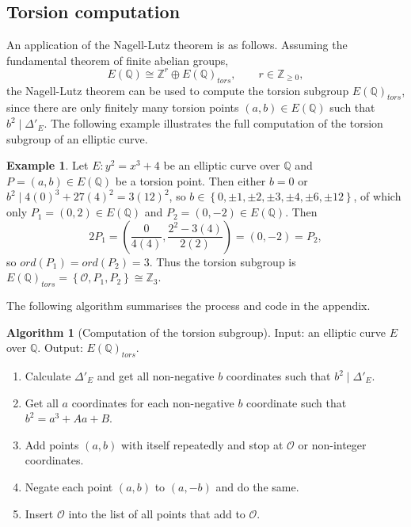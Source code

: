 \documentclass{article}
\newcommand{\Z}{\mathbb{Z}}
\newcommand{\Q}{\mathbb{Q}}
\newcommand{\rb}[1]{\left( #1 \right)}
\newcommand{\cb}[1]{\left\{ #1 \right\}}
\theoremstyle{definition}\newtheorem*{definition}{Definition}
\theoremstyle{definition}\newtheorem*{example}{Example}
\theoremstyle{definition}\newtheorem*{remark}{Remark}
\newtheorem{algorithm}[proposition]{Algorithm}
\begin{document}
\subsection{Torsion computation}

An application of the Nagell-Lutz theorem is as follows. Assuming the fundamental theorem of finite abelian groups,
$$ E\rb{\Q} \cong \Z^r \oplus E\rb{\Q}_{tors}, \qquad r \in \Z_{\ge 0}, $$
the Nagell-Lutz theorem can be used to compute the torsion subgroup $ E\rb{\Q}_{tors} $, since there are only finitely many torsion points $ \rb{a, b} \in E\rb{\Q} $ such that $ b^2 \mid \Delta'_E $. The following example illustrates the full computation of the torsion subgroup of an elliptic curve.

\begin{example}
Let $ E : y^2 = x^3 + 4 $ be an elliptic curve over $ \Q $ and $ P = \rb{a, b} \in E\rb{\Q} $ be a torsion point. Then either $ b = 0 $ or $ b^2 \mid 4\rb{0}^3 + 27\rb{4}^2 = 3\rb{12}^2 $, so $ b \in \cb{0, \pm 1, \pm 2, \pm 3, \pm 4, \pm 6, \pm 12} $, of which only $ P_1 = \rb{0, 2} \in E\rb{\Q} $ and $ P_2 = \rb{0, -2} \in E\rb{\Q} $. Then
$$ 2P_1 = \rb{\dfrac{0}{4\rb{4}}, \dfrac{2^2 - 3\rb{4}}{2\rb{2}}} = \rb{0, -2} = P_2, $$
so $ ord\rb{P_1} = ord\rb{P_2} = 3 $. Thus the torsion subgroup is $ E\rb{\Q}_{tors} = \cb{\mathcal{O}, P_1, P_2} \cong \Z_3 $.
\end{example}

The following algorithm summarises the process and code in the appendix.

\begin{algorithm}[Computation of the torsion subgroup]
Input: an elliptic curve $ E $ over $ \Q $. Output: $ E\rb{\Q}_{tors} $.
\begin{enumerate}
\item Calculate $ \Delta'_E $ and get all non-negative $ b $ coordinates such that $ b^2 \mid \Delta'_E $.
\item Get all $ a $ coordinates for each non-negative $ b $ coordinate such that $ b^2 = a^3 + Aa + B $.
\item Add points $ \rb{a, b} $ with itself repeatedly and stop at $ \mathcal{O} $ or non-integer coordinates.
\item Negate each point $ \rb{a, b} $ to $ \rb{a, -b} $ and do the same.
\item Insert $ \mathcal{O} $ into the list of all points that add to $ \mathcal{O} $.
\end{enumerate}
\end{algorithm}
\end{document}
